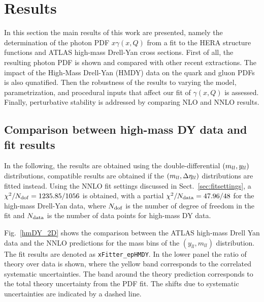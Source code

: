 \section{Results}
\label{sec:results}

In this section the main results of this work are presented, namely the
determination of the photon PDF $x\gamma(x,Q)$ from a fit to the
HERA structure functions and ATLAS high-mass Drell-Yan cross sections.
%
First of all, the resulting photon PDF is shown and compared with other
recent extractions.
%
The impact of the High-Mass Drell-Yan (HMDY) data on
the quark and gluon PDFs is also qunatified.
%
Then the robustness of the results to varying the model, parametrization, and procedural
inputs that affect our fit of $\gamma(x,Q)$ is assessed.
%
Finally, perturbative stability is addressed by comparing NLO and
NNLO results.

\subsection{Comparison between high-mass DY data and fit results}

In the following, the results are obtained using the
double-differential $\left( m_{ll},y_{ll}\right)$ distributions, compatible results are obtained if the
$\left( m_{ll},\Delta\eta_{ll}\right)$ distributions are fitted instead.
%
Using the NNLO fit settings discussed in Sect.~\ref{sec:fitsettings},
a $\chi^{2}/N_{\rm dof} = 1235.85/1056$ is obtained, with a partial
$\chi^2/N_{\rm data} = 47.96/48$ for the high-mass Drell-Yan data,
where $N_{\rm dof}$ is the number of degree of freedom in the fit and 
$N_{\rm data}$  is the number of data points for high-mass DY data.

Fig.~\ref{hmDY_2D} shows the comparison between the ATLAS
high-mass Drell Yan data and the NNLO predictions for the mass
bins of the $(y_{ll},m_{ll})$ distribution.
%
The fit results are denoted as {\tt xFitter\_epHMDY}.
%
In the lower panel the ratio of theory over data is shown, where the
yellow band corresponds to the correlated systematic uncertainties.
%
The band around the theory prediction corresponds to the total theory
uncertainty from the PDF fit. 
%
The shifts due to systematic uncertainties are indicated by a dashed
line.

